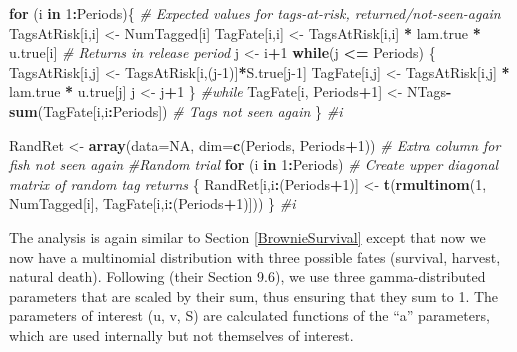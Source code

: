 \documentclass[
]{krantz}
\makeatletter
\newenvironment{Shaded}{\begin{snugshade}}{\end{snugshade}}
\newcommand{\AttributeTok}[1]{\textcolor[rgb]{0.27,0.27,0.27}{#1}}
\newcommand{\CommentTok}[1]{\textcolor[rgb]{0.37,0.37,0.37}{\textit{#1}}}
\newcommand{\ConstantTok}[1]{\textcolor[rgb]{0.37,0.37,0.37}{#1}}
\newcommand{\ControlFlowTok}[1]{\textcolor[rgb]{0.27,0.27,0.27}{\textbf{#1}}}
\newcommand{\DecValTok}[1]{\textcolor[rgb]{0.06,0.06,0.06}{#1}}
\newcommand{\FunctionTok}[1]{\textcolor[rgb]{0.27,0.27,0.27}{\textbf{#1}}}
\newcommand{\NormalTok}[1]{#1}
\newcommand{\OtherTok}[1]{\textcolor[rgb]{0.37,0.37,0.37}{#1}}
\newcommand{\SpecialCharTok}[1]{\textcolor[rgb]{0.43,0.43,0.43}{\textbf{#1}}}
\newenvironment{kframe}{%
\medskip{}
\setlength{\fboxsep}{.8em}
 \def\at@end@of@kframe{}%
 \ifinner\ifhmode%
  \def\at@end@of@kframe{\end{minipage}}%
  \begin{minipage}{\columnwidth}%
 \fi\fi%
 \def\FrameCommand##1{\hskip\@totalleftmargin \hskip-\fboxsep
 \colorbox{shadecolor}{##1}\hskip-\fboxsep
     \hskip-\linewidth \hskip-\@totalleftmargin \hskip\columnwidth}%
 \MakeFramed {\advance\hsize-\width
   \@totalleftmargin\z@ \linewidth\hsize
   \@setminipage}}%
 {\par\unskip\endMakeFramed%
 \at@end@of@kframe}
\renewenvironment{Shaded}{\begin{kframe}}{\end{kframe}}
\makeatother
\begin{document}
\begin{Shaded}
\begin{Highlighting}[]
\ControlFlowTok{for}\NormalTok{ (i }\ControlFlowTok{in} \DecValTok{1}\SpecialCharTok{:}\NormalTok{Periods)\{ }\CommentTok{\# Expected values for tags{-}at{-}risk, returned/not{-}seen{-}again}
\NormalTok{  TagsAtRisk[i,i] }\OtherTok{\textless{}{-}}\NormalTok{ NumTagged[i]}
\NormalTok{  TagFate[i,i] }\OtherTok{\textless{}{-}}\NormalTok{  TagsAtRisk[i,i] }\SpecialCharTok{*}\NormalTok{ lam.true }\SpecialCharTok{*}\NormalTok{ u.true[i] }\CommentTok{\# Returns in release period}
\NormalTok{  j }\OtherTok{\textless{}{-}}\NormalTok{ i}\SpecialCharTok{+}\DecValTok{1}
  \ControlFlowTok{while}\NormalTok{(j }\SpecialCharTok{\textless{}=}\NormalTok{ Periods) \{}
\NormalTok{    TagsAtRisk[i,j] }\OtherTok{\textless{}{-}}\NormalTok{ TagsAtRisk[i,(j}\DecValTok{{-}1}\NormalTok{)]}\SpecialCharTok{*}\NormalTok{S.true[j}\DecValTok{{-}1}\NormalTok{]}
\NormalTok{    TagFate[i,j] }\OtherTok{\textless{}{-}}\NormalTok{ TagsAtRisk[i,j] }\SpecialCharTok{*}\NormalTok{ lam.true }\SpecialCharTok{*}\NormalTok{ u.true[j]}
\NormalTok{    j }\OtherTok{\textless{}{-}}\NormalTok{ j}\SpecialCharTok{+}\DecValTok{1}
\NormalTok{   \} }\CommentTok{\#while}
\NormalTok{  TagFate[i, Periods}\SpecialCharTok{+}\DecValTok{1}\NormalTok{] }\OtherTok{\textless{}{-}}\NormalTok{ NTags}\SpecialCharTok{{-}}\FunctionTok{sum}\NormalTok{(TagFate[i,i}\SpecialCharTok{:}\NormalTok{Periods]) }\CommentTok{\# Tags not seen again}
\NormalTok{  \} }\CommentTok{\#i}

\NormalTok{RandRet }\OtherTok{\textless{}{-}} \FunctionTok{array}\NormalTok{(}\AttributeTok{data=}\ConstantTok{NA}\NormalTok{, }\AttributeTok{dim=}\FunctionTok{c}\NormalTok{(Periods, Periods}\SpecialCharTok{+}\DecValTok{1}\NormalTok{))  }\CommentTok{\# Extra column for fish not seen again}
\CommentTok{\#Random trial}
  \ControlFlowTok{for}\NormalTok{ (i }\ControlFlowTok{in} \DecValTok{1}\SpecialCharTok{:}\NormalTok{Periods) }\CommentTok{\# Create upper diagonal matrix of random tag returns}
\NormalTok{  \{}
\NormalTok{    RandRet[i,i}\SpecialCharTok{:}\NormalTok{(Periods}\SpecialCharTok{+}\DecValTok{1}\NormalTok{)] }\OtherTok{\textless{}{-}} \FunctionTok{t}\NormalTok{(}\FunctionTok{rmultinom}\NormalTok{(}\DecValTok{1}\NormalTok{, NumTagged[i], TagFate[i,i}\SpecialCharTok{:}\NormalTok{(Periods}\SpecialCharTok{+}\DecValTok{1}\NormalTok{)]))}
\NormalTok{  \} }\CommentTok{\#i}
\end{Highlighting}
\end{Shaded}

The analysis is again similar to Section \ref{BrownieSurvival} except that now we now have a multinomial distribution with three possible fates (survival, harvest, natural death). Following \citet{kéry.schaub_2011} (their Section 9.6), we use three gamma-distributed parameters that are scaled by their sum, thus ensuring that they sum to 1. The parameters of interest (u, v, S) are calculated functions of the ``a'' parameters, which are used internally but not themselves of interest.
\end{document}
